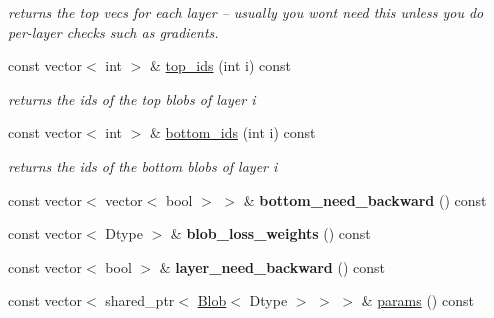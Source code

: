 \begin{DoxyCompactItemize}
\begin{DoxyCompactList}\small\item\em returns the top vecs for each layer -- usually you won\textquotesingle{}t need this unless you do per-\/layer checks such as gradients. \end{DoxyCompactList}\item 
const vector$<$ int $>$ \& \hyperlink{classcaffe_1_1Net_add3f8fb2e7fddf1e7a6ca02e6a1c36a9}{top\+\_\+ids} (int i) const \hypertarget{classcaffe_1_1Net_add3f8fb2e7fddf1e7a6ca02e6a1c36a9}{}\label{classcaffe_1_1Net_add3f8fb2e7fddf1e7a6ca02e6a1c36a9}

\begin{DoxyCompactList}\small\item\em returns the ids of the top blobs of layer i \end{DoxyCompactList}\item 
const vector$<$ int $>$ \& \hyperlink{classcaffe_1_1Net_a5a4c087198fec3d511aec96b4d57b14f}{bottom\+\_\+ids} (int i) const \hypertarget{classcaffe_1_1Net_a5a4c087198fec3d511aec96b4d57b14f}{}\label{classcaffe_1_1Net_a5a4c087198fec3d511aec96b4d57b14f}

\begin{DoxyCompactList}\small\item\em returns the ids of the bottom blobs of layer i \end{DoxyCompactList}\item 
const vector$<$ vector$<$ bool $>$ $>$ \& {\bfseries bottom\+\_\+need\+\_\+backward} () const \hypertarget{classcaffe_1_1Net_a355a727f236c0b2efa1c6a27c6d09f72}{}\label{classcaffe_1_1Net_a355a727f236c0b2efa1c6a27c6d09f72}

\item 
const vector$<$ Dtype $>$ \& {\bfseries blob\+\_\+loss\+\_\+weights} () const \hypertarget{classcaffe_1_1Net_a806306ac54b7f502bf5cc3116f56231a}{}\label{classcaffe_1_1Net_a806306ac54b7f502bf5cc3116f56231a}

\item 
const vector$<$ bool $>$ \& {\bfseries layer\+\_\+need\+\_\+backward} () const \hypertarget{classcaffe_1_1Net_ad1bdf2249f14a7d2b6e0d9f139e76f8a}{}\label{classcaffe_1_1Net_ad1bdf2249f14a7d2b6e0d9f139e76f8a}

\item 
const vector$<$ shared\+\_\+ptr$<$ \hyperlink{classcaffe_1_1Blob}{Blob}$<$ Dtype $>$ $>$ $>$ \& \hyperlink{classcaffe_1_1Net_aa1b93c7dd25da5e6edfb0c67d934a7b8}{params} () const \hypertarget{classcaffe_1_1Net_aa1b93c7dd25da5e6edfb0c67d934a7b8}{}\label{classcaffe_1_1Net_aa1b93c7dd25da5e6edfb0c67d934a7b8}


\end{DoxyCompactItemize}
